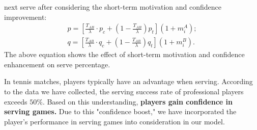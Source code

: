 \documentclass{mcmthesis}
\begin{document}
next serve after considering the short-term motivation and confidence improvement:
\begin{equation*}
  \begin{split}
    p = \left[ \frac{T_{AB}}{\lambda} \cdot p_c + \left( 1 - \frac{T_{AB}}{\lambda} \right) p_t \right] (1 + m_i^A);\\
    q = \left[ \frac{T_{AB}}{\lambda} \cdot q_c + \left( 1 - \frac{T_{AB}}{\lambda} \right) q_t \right] (1 + m_i^B).
  \end{split}
\end{equation*}
The above equation shows the effect of short-term motivation and confidence enhancement
on serve percentage.\par
In tennis matches, players typically have an advantage when serving. According to the
data we have collected, the serving success rate of professional players exceeds $50\%$. Based
on this understanding, \textbf{players gain confidence in serving games.} Due to this "confidence
boost," we have incorporated the player’s performance in serving games into consideration in
our model.
\end{document}
